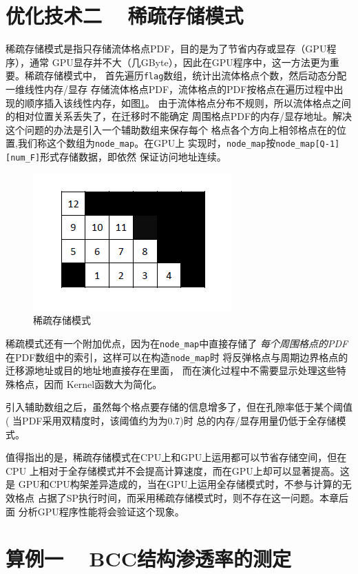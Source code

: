 \section{优化技术二 ~ 稀疏存储模式}\label{sec:opt2}
稀疏存储模式是指只存储流体格点PDF，目的是为了节省内存或显存（GPU程序），通常
GPU显存并不大（几GByte），因此在GPU程序中，这一方法更为重要。稀疏存储模式中，
首先遍历\texttt{flag}数组，统计出流体格点个数，然后动态分配一维线性内存/显存
存储流体格点PDF，流体格点的PDF按格点在遍历过程中出现的顺序插入该线性内存，如图\ref{fig:node_map}。
由于流体格点分布不规则，所以流体格点之间的相对位置关系丢失了，在迁移时不能确定
周围格点PDF的内存/显存地址。解决这个问题的办法是引入一个辅助数组来保存每个
格点各个方向上相邻格点在的位置,我们称这个数组为\texttt{node\_map}。在GPU上
实现时，\texttt{node\_map}按\texttt{node\_map[Q-1][num\_F]}形式存储数据，即依然
保证访问地址连续。
\begin{figure}[htpb]
  \centering
  \includegraphics[]{img/node_map}
  \caption{稀疏存储模式}
  \label{fig:node_map}
\end{figure}
稀疏模式还有一个附加优点，因为在\texttt{node\_map}中直接存储了
\emph{每个周围格点的PDF}在PDF数组中的索引，这样可以在构造\texttt{node\_map}时
将反弹格点与周期边界格点的迁移源地址或目的地址地直接存在里面，
而在演化过程中不需要显示处理这些特殊格点，因而
Kernel函数大为简化。

引入辅助数组之后，虽然每个格点要存储的信息增多了，但在孔隙率低于某个阈值(
当PDF采用双精度时，该阈值约为为0.7)时
总的内存/显存用量仍低于全存储模式。

值得指出的是，稀疏存储模式在CPU上和GPU上运用都可以节省存储空间，但在CPU
上相对于全存储模式并不会提高计算速度，而在GPU上却可以显著提高。这是
GPU和CPU构架差异造成的，当在GPU上运用全存储模式时，不参与计算的无效格点
占据了SP执行时间，而采用稀疏存储模式时，则不存在这一问题。本章后面
分析GPU程序性能将会验证这个现象。

\section{算例一 ~ BCC结构渗透率的测定}
